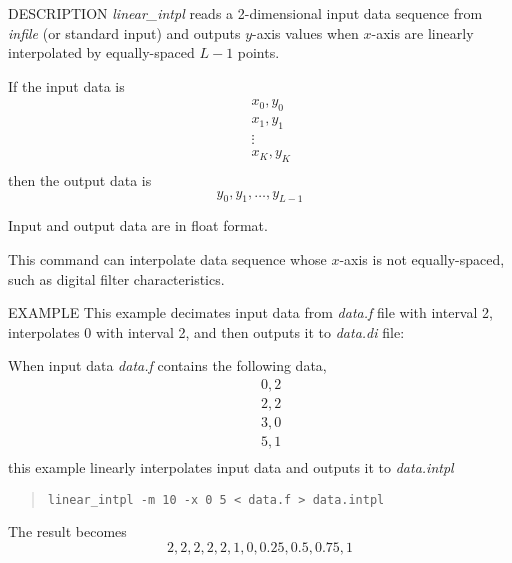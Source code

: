 \begin{qsection}{DESCRIPTION}
{\em linear\_intpl} reads a 2-dimensional input data sequence
from {\em infile} (or standard input) and outputs $y$-axis values
when $x$-axis are linearly interpolated by equally-spaced $L-1$ points.

If the input data is
\begin{eqnarray*}
&& x_0, y_0 \nonumber \\
&& x_1, y_1 \nonumber \\
&& \vdots   \\
&& x_K, y_K \nonumber \\
\end{eqnarray*}
then the output data is
\begin{displaymath}
y_0, y_1, \ldots, y_{L-1}
\end{displaymath}

\par
Input and output data are in float format.
\par
This command can interpolate data sequence whose $x$-axis is not equally-spaced,
such as digital filter characteristics.

\end{qsection}

\begin{options}
\end{options}

\begin{qsection}{EXAMPLE}
This example decimates input data from {\em data.f} file with interval 2,
interpolates 0 with interval 2, and then outputs it to {\em
data.di} file:

When input data {\em data.f} contains the following data,
\begin{eqnarray*}
&& 0, 2 \nonumber \\
&& 2, 2 \nonumber \\
&& 3, 0   \\
&& 5, 1 \nonumber \\
\end{eqnarray*}
this example linearly interpolates input data and outputs it to {\em data.intpl}
\begin{quote}
 \verb!linear_intpl -m 10 -x 0 5 < data.f > data.intpl!
\end{quote}
The result becomes
\begin{displaymath}
2, 2, 2, 2, 2, 1, 0, 0.25, 0.5, 0.75, 1
\end{displaymath}
\end{qsection}
% 

